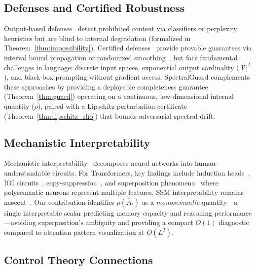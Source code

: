 \documentclass[10pt,twocolumn]{article}
\begin{document}
\subsection{Defenses and Certified Robustness}

Output-based defenses~\cite{helbling2023llm,jain2023baseline} detect prohibited content via classifiers or perplexity heuristics but are blind to internal degradation (formalized in Theorem~\ref{thm:impossibility}). Certified defenses~\cite{jia2019certified,huang2019achieving} provide provable guarantees via interval bound propagation or randomized smoothing~\cite{cohen2019certified}, but face fundamental challenges in language: discrete input spaces, exponential output cardinality ($|\mathcal{V}|^L$), and black-box prompting without gradient access. SpectralGuard complements these approaches by providing a deployable completeness guarantee (Theorem~\ref{thm:guard}) operating on a continuous, low-dimensional internal quantity ($\rho$), paired with a Lipschitz perturbation certificate (Theorem~\ref{thm:lipschitz_rho}) that bounds adversarial spectral drift.

\subsection{Mechanistic Interpretability}

Mechanistic interpretability~\cite{olah2020zoom,elhage2021mathematical} decomposes neural networks into human-understandable circuits. For Transformers, key findings include induction heads~\cite{olsson2022context}, IOI circuits~\cite{wang2022interpretability}, copy-suppression~\cite{mcdougall2023copy}, and superposition phenomena~\cite{elhage2022toy} where polysemantic neurons represent multiple features. SSM interpretability remains nascent~\cite{bereska2024mechanistic}. Our contribution identifies $\rho(\bar{A}_t)$ as a \emph{monosemantic} quantity---a single interpretable scalar predicting memory capacity and reasoning performance---avoiding superposition's ambiguity and providing a compact $O(1)$ diagnostic compared to attention pattern visualization at $O(L^2)$.

\subsection{Control Theory Connections}
\end{document}
